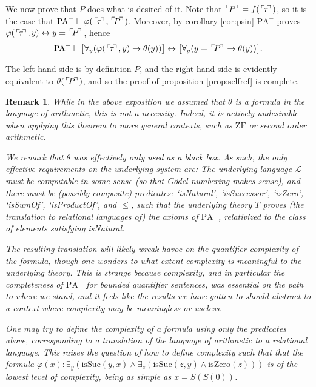 \documentclass{article}
\newtheorem{remark}[theorem]{Remark}
\theoremstyle{nonumberplain}
\newcommand{\PA}{\mathrm{PA}}
\newcommand{\WPA}{\PA^-}
\newcommand{\gn}[1]{\setbox0=\hbox{$\mathclap{\phantom{t}}#1$} \dimen0=\ht0 \advance\dimen0 by -1.25ex \,\raise\dimen0\hbox{$\ulcorner$} \! \box0 \! \raise\dimen0\hbox{$\urcorner$}\,}
\begin{document}
We now prove that $P$ does what is desired of it. Note that $\gn P = f(\gn \tau)$, so it is the case that $\WPA \vdash \varphi(\gn\tau, \gn P)$. Moreover, by corollary \ref{cor:psin} $\WPA$ proves $\varphi(\gn\tau, y) \leftrightarrow y=\gn P$, hence
\begin{equation}
\WPA \vdash \big[ \forall_y(\varphi(\gn \tau,y) \rightarrow \theta(y)) \big] \leftrightarrow \big[ \forall_y (y = \gn P \rightarrow \theta(y)) \big].
\end{equation}

The left-hand side is by definition $P$, and the right-hand side is evidently equivalent to $\theta(\gn P)$, and so the proof of proposition \ref{prop:selfref} is complete.

\begin{remark}
While in the above exposition we assumed that $\theta$ is a formula in the language of arithmetic, this is not a necessity. Indeed, it is actively undesirable when applying this theorem to more general contexts, such as $\mathrm{ZF}$ or second order arithmetic.

We remark that $\theta$ was effectively only used as a black box. As such, the only effective requirements on the underlying system are: The underlying language $\mathcal{L}$ must be computable in some sense (so that Gödel numbering makes sense), and there must be (possibly composite) predicates: `isNatural', `isSuccessor', `isZero', `isSumOf', `isProductOf', and $\leq$, such that the underlying theory $T$ proves (the translation to relational languages of) the axioms of $\WPA$, relativized to the class of elements satisfying isNatural.

The resulting translation will likely wreak havoc on the quantifier complexity of the formula, though one wonders to what extent complexity is meaningful to the underlying theory. This is strange because complexity, and in particular the completeness of $\WPA$ for bounded quantifier sentences, was essential on the path to where we stand, and it feels like the results we have gotten to should abstract to a context where complexity may be meaningless or useless.

One may try to define the complexity of a formula using only the predicates above, corresponding to a translation of the language of arithmetic to a relational language. This raises the question of how to define complexity such that that the formula $\varphi(x) \colon \exists_y (\mathrm{isSuc}(y,x) \land \exists_z (\mathrm{isSuc}(z,y) \land \mathrm{isZero}(z)))$ is of the lowest level of complexity, being as simple as $x = S(S(0))$.


\end{remark}
\end{document}
